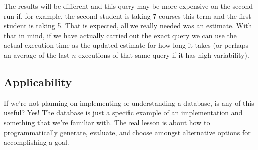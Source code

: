 The results will be different and this query may be more expensive on the second run if, for example, the second student is taking 7 courses this term and the first student is taking 5. That is expected, all we really needed was an estimate. With that in mind, if we have actually carried out the exact query we can use the actual execution time as the updated estimate for how long it takes (or perhaps an average of the last $n$ executions of that same query if it has high variability). 

\subsection*{Applicability}
If we're not planning on implementing or understanding a database, is any of this useful? Yes! The database is just a specific example of an implementation and something that we're familiar with. The real lesson is about how to programmatically generate, evaluate, and choose amongst alternative options for accomplishing a goal. 





